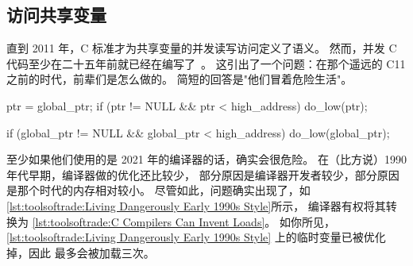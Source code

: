 \subsection{访问共享变量}
\label{sec:toolsoftrade:Accessing Shared Variables}

直到 2011 年，C 标准才为共享变量的并发读写访问定义了语义。
然而，并发 C 代码至少在二十五年前就已经在编写了~\cite{Beck85,Inman85}。
这引出了一个问题：在那个遥远的 C11 之前的时代，前辈们是怎么做的。
简短的回答是"他们冒着危险生活"。

\begin{listing}
\begin{fcvlabel}
\begin{VerbatimL}[commandchars=\\\{\}]
ptr = global_ptr;
if (ptr != NULL && ptr < high_address)
	do_low(ptr);
\end{VerbatimL}
\end{fcvlabel}
\caption{1990 年代早期的冒险风格}
\label{lst:toolsoftrade:Living Dangerously Early 1990s Style}
\end{listing}

\begin{listing}
\begin{fcvlabel}
\begin{VerbatimL}[commandchars=\\\{\}]
if (global_ptr != NULL &&
    global_ptr < high_address)
	do_low(global_ptr);
\end{VerbatimL}
\end{fcvlabel}
\caption{C 编译器可以发明加载}
\label{lst:toolsoftrade:C Compilers Can Invent Loads}
\end{listing}

至少如果他们使用的是 2021 年的编译器的话，确实会很危险。
在（比方说）1990 年代早期，编译器做的优化还比较少，
部分原因是编译器开发者较少，部分原因是那个时代的内存相对较小。
尽管如此，问题确实出现了，如
\cref{lst:toolsoftrade:Living Dangerously Early 1990s Style}所示，
编译器有权将其转换为
\cref{lst:toolsoftrade:C Compilers Can Invent Loads}。
如你所见，
\cref{lst:toolsoftrade:Living Dangerously Early 1990s Style}
上的临时变量已被优化掉，因此  最多会被加载三次。


